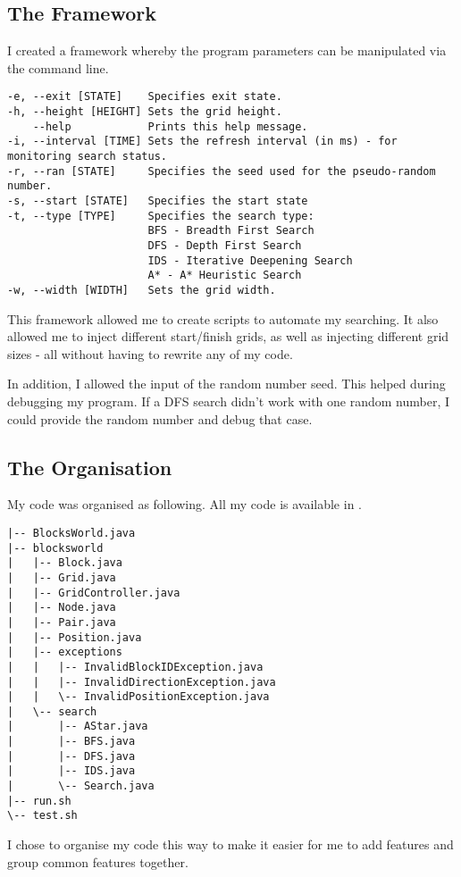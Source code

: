\documentclass[a4paper]{article}
\begin{document}
\subsection{The Framework}
I created a framework whereby the program parameters can be manipulated via the command line.
\begin{lstlisting}
-e, --exit [STATE]    Specifies exit state.
-h, --height [HEIGHT] Sets the grid height.
    --help            Prints this help message.
-i, --interval [TIME] Sets the refresh interval (in ms) - for monitoring search status.
-r, --ran [STATE]     Specifies the seed used for the pseudo-random number.
-s, --start [STATE]   Specifies the start state
-t, --type [TYPE]     Specifies the search type:
                      BFS - Breadth First Search
                      DFS - Depth First Search
                      IDS - Iterative Deepening Search
                      A* - A* Heuristic Search
-w, --width [WIDTH]   Sets the grid width.
\end{lstlisting}
This framework allowed me to create scripts to automate my searching.
It also allowed me to inject different start/finish grids, as well as injecting different grid sizes - all without having to rewrite any of my code.

In addition, I allowed the input of the random number seed.
This helped during debugging my program.
If a DFS search didn't work with one random number, I could provide the random number and debug that case.

\subsection{The Organisation}\label{sec:approach_organisation}
My code was organised as following.
All my code is available in .
\begin{lstlisting}
|-- BlocksWorld.java
|-- blocksworld
|   |-- Block.java
|   |-- Grid.java
|   |-- GridController.java
|   |-- Node.java
|   |-- Pair.java
|   |-- Position.java
|   |-- exceptions
|   |   |-- InvalidBlockIDException.java
|   |   |-- InvalidDirectionException.java
|   |   \-- InvalidPositionException.java
|   \-- search
|       |-- AStar.java
|       |-- BFS.java
|       |-- DFS.java
|       |-- IDS.java
|       \-- Search.java
|-- run.sh
\-- test.sh
\end{lstlisting}

I chose to organise my code this way to make it easier for me to add features and group common features together.
\end{document}
